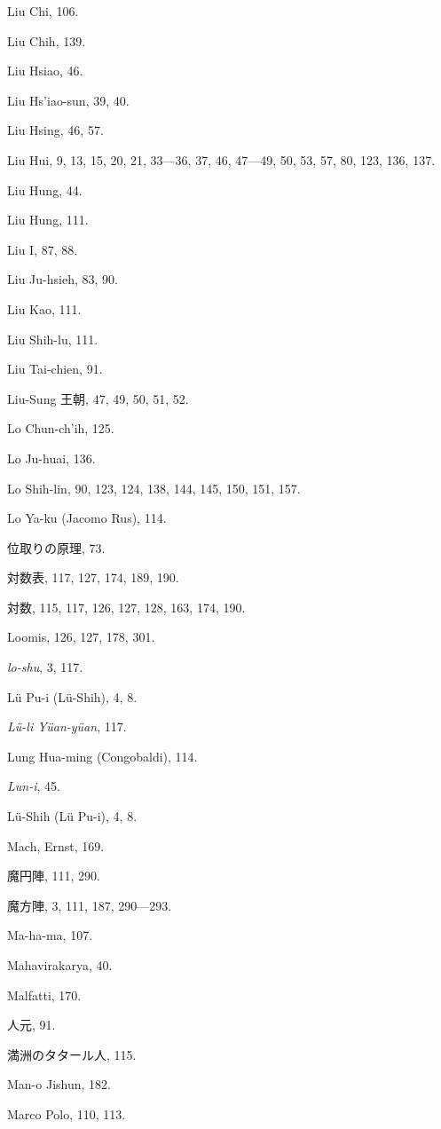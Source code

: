 \documentclass[11pt]{article}
\newcommand{\scanpage}[2]{\clearpage\setcounter{footnote}{0}\noindent{\footnotesize\color{gray}PDF #1 頁 · #2}\par\medskip}
\begin{document}
\scanpage{0353}{印刷頁 339}
Liu Chi, 106.\par
Liu Chih, 139.\par
Liu Hsiao, 46.\par
Liu Hs'iao-sun, 39, 40.\par
Liu Hsing, 46, 57.\par
Liu Hui, 9, 13, 15, 20, 21, 33—36, 37, 46, 47—49, 50, 53, 57, 80, 123, 136, 137.\par
Liu Hung, 44.\par
Liu Hung, 111.\par
Liu I, 87, 88.\par
Liu Ju-hsieh, 83, 90.\par
Liu Kao, 111.\par
Liu Shih-lu, 111.\par
Liu Tai-chien, 91.\par
Liu-Sung 王朝, 47, 49, 50, 51, 52.\par
Lo Chun-ch'ih, 125.\par
Lo Ju-huai, 136.\par
Lo Shih-lin, 90, 123, 124, 138, 144, 145, 150, 151, 157.\par
Lo Ya-ku (Jacomo Rus), 114.\par
位取りの原理, 73.\par
対数表, 117, 127, 174, 189, 190.\par
対数, 115, 117, 126, 127, 128, 163, 174, 190.\par
Loomis, 126, 127, 178, 301.\par
\emph{lo-shu}, 3, 117.\par
Lü Pu-i (Lü-Shih), 4, 8.\par
\emph{Lü-li Yüan-yüan}, 117.\par
Lung Hua-ming (Congobaldi), 114.\par
\emph{Lun-i}, 45.\par
Lü-Shih (Lü Pu-i), 4, 8.\par
\medskip
Mach, Ernst, 169.\par
魔円陣, 111, 290.\par
魔方陣, 3, 111, 187, 290—293.\par
Ma-ha-ma, 107.\par
Mahavirakarya, 40.\par
Malfatti, 170.\par
人元, 91.\par
満洲のタタール人, 115.\par
Man-o Jishun, 182.\par
Marco Polo, 110, 113.\par
\end{document}
